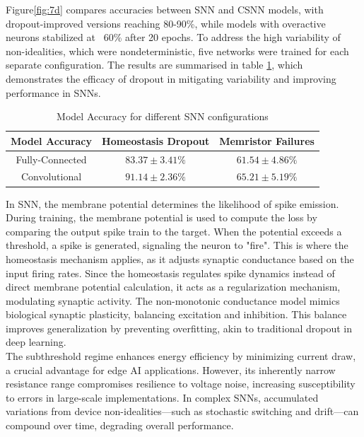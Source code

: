 \noindent Figure\ref{fig:7d} compares accuracies between SNN and CSNN models, with dropout-improved versions reaching 80-90\%, while models with overactive neurons stabilized at ~60\% after 20 epochs. To address the high variability of non-idealities, which were nondeterministic, five networks were trained for each separate configuration. The results are summarised in table \ref{table:7a}, which demonstrates the efficacy of dropout in mitigating variability and improving performance in SNNs. \\

\begin{table}[!t]
    \caption{Model Accuracy for different SNN configurations}
    \begin{center}
    \begin{tabular}{|c|c|c|}
    \hline
    Model Accuracy  & Homeostasis Dropout & Memristor Failures \\ \hline
    Fully-Connected & $83.37 \pm 3.41 \%$  & $61.54 \pm 4.86 \%$ \\ \hline
    Convolutional   & $91.14 \pm 2.36 \%$  & $65.21 \pm 5.19 \%$  \\ \hline
    \end{tabular}
    \label{table:7a}
    \end{center}
    \vspace*{-\baselineskip}
\end{table}


\noindent In SNN, the membrane potential determines the likelihood of spike emission. During training, the membrane potential is used to compute the loss by comparing the output spike train to the target. When the potential exceeds a threshold, a spike is generated, signaling the neuron to "fire". This is where the homeostasis mechanism applies, as it adjusts synaptic conductance based on the input firing rates. Since the homeostasis regulates spike dynamics instead of direct membrane potential calculation, it acts as a regularization mechanism, modulating synaptic activity. The non-monotonic conductance model mimics biological synaptic plasticity, balancing excitation and inhibition. This balance improves generalization by preventing overfitting, akin to traditional dropout in deep learning.\\

\noindent The subthreshold regime enhances energy efficiency by minimizing current draw, a crucial advantage for edge AI applications. However, its inherently narrow resistance range compromises resilience to voltage noise, increasing susceptibility to errors in large-scale implementations. In complex SNNs, accumulated variations from device non-idealities—such as stochastic switching and drift—can compound over time, degrading overall performance. \\

